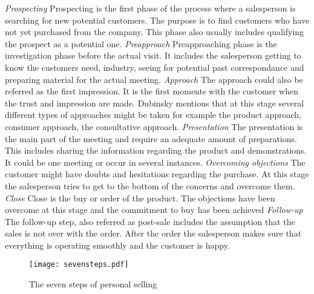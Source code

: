 \documentclass[12pt,a4paper,oneside,pdftex]{report}
\begin{document}
\newline \newline \emph{Prospecting}\newline 
Prospecting is the first phase of the process where a salesperson is searching for new potential customers. The purpose is to find customers who have not yet purchased from the company. This phase also usually includes qualifying the prospect as a potential one. \citep{Jobber}\newline \newline
\emph{Preapproach}\newline 
Preapproaching phase is the investigation phase before the actual visit. It includes the salesperson getting to know the customers need, industry, seeing for potential past correspondance and preparing material for the actual meeting. \citep{Moncrief}\newline \newline
\emph{Approach}\newline
The approach could also be referred as the first impression. It is the first moments with the customer when the trust and impression are made. Dubinsky mentions that at this stage several different types of approaches might be taken for example the product approach, consumer approach, the consultative approach. \citep{Dubinsky} \newline \newline
\emph{Presentation}\newline
The presentation is the main part of the meeting and require an adequate amount of preparations. This includes sharing the information regarding the product and demonstrations. It could be one meeting or occur in several instances. \citep{Moncrief}\newline \newline
\emph{Overcoming objections}\newline
The customer might have doubts and hesitations regarding the purchase. At this stage the salesperson tries to get to the bottom of the concerns and overcome them. \citep{Moncrief}\newline \newline
\emph{Close}\newline
Close is the buy or order of the product. The objections have been overcome at this stage and the commitment to buy has been achieved \citep{Moncrief} \newline \newline
\emph{Follow-up}\newline
The follow-up step, also referred as post-sale includes the assumption that the sales is not over with the order. After the order the salesperson makes sure that everything is operating smoothly and the customer is happy. \citep{Dubinsky}
\newline 
\begin{figure}[ht]
  \begin{center}
    \texttt{[image: sevensteps.pdf]}
    \caption{The seven steps of personal selling}
    \label{fig:seven}
  \end{center}
\end{figure}
\end{document}
